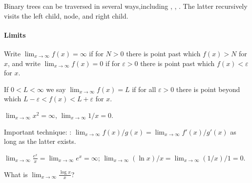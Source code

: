 Binary trees can be traversed in several ways,including , , . The latter recursively visits the left child, node, and right child.

\paragraph{Limits}

Write $\lim_{x\to \infty} f(x) = \infty$ if for  $N>0$ there is  point past which $f(x) > N$ for  $x$, and write $\lim_{x\to\infty} f(x) = 0$ if for  $\varepsilon>0$ there is  point past which $f(x) < \varepsilon$ for  $x$.

If $0 < L < \infty$ we say $\lim_{x\to\infty} f(x) = L$ if for all $\varepsilon > 0$ there is  point beyond which $L - \varepsilon < f(x) < L + \varepsilon$ for  $x$.

\begin{Example}
$\lim_{x\to\infty} x^2 = \infty$, $\lim_{x\to \infty} 1/x = 0$.
\end{Example}

Important technique: : $\lim_{x\to \infty} f(x)/g(x) = \lim_{x\to \infty} f'(x)/g'(x)$ as long as the latter exists. 

\begin{Example}
 $\lim_{x\to\infty} \frac{e^x}{x} = \lim_{x\to\infty} e^x = \infty$; $\lim_{x\to\infty} (\ln x)/x = \lim_{x\to\infty} (1/x)/1 = 0$.
 \end{Example}
 
 \begin{Boxample}[5]
What is  $\lim_{x\to\infty} \frac{\log x}{x}$?
 
 \end{Boxample}



